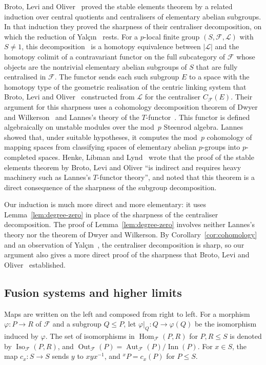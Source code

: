 \documentclass[10pt]{amsart}
\theoremstyle{definition}
\DeclareMathOperator{\Aut}{Aut}
\DeclareMathOperator{\Out}{Out}
\DeclareMathOperator{\Hom}{Hom}
\numberwithin{equation}{section}
\renewcommand{\le}{\leqslant}
\newcommand{\F}{\mathcal F}
\newcommand{\Inn}{\operatorname{Inn}}
\newcommand{\Iso}{\operatorname{Iso}}
\begin{document}
Broto, Levi and Oliver~\cite[proof of Theorem~5.8]{BLO} proved the stable elements theorem by a related induction over central quotients and centralisers of elementary abelian subgroups. In that induction they proved the sharpness of their centraliser decomposition, on which the reduction of Yal\c{c}\i{}n~\cite[Theorem~1.8]{Yalcin} rests. For a $p$-local finite group $(S,\F,\mathcal L)$ with $S\ne1$, this decomposition~\cite[Theorem~2.6]{BLO} is a homotopy equivalence between $|\mathcal L|$ and the homotopy colimit of a contravariant functor on the full subcategory of $\F$ whose objects are the nontrivial elementary abelian subgroups of $S$ that are fully centralised in $\F$. The functor sends each such subgroup $E$ to a space with the homotopy type of the geometric realisation of the centric linking system that Broto, Levi and Oliver~\cite[Definition~2.4 and Proposition~2.5(c)]{BLO} constructed from $\mathcal L$ for the centraliser $C_\F(E)$. Their argument for this sharpness uses a cohomology decomposition theorem of Dwyer and Wilkerson~\cite[Theorem~1.2]{DW1992} and Lannes's theory of the $T$-functor~\cite{Lannes1992}. This functor is defined algebraically on unstable modules over the mod~$p$ Steenrod algebra. Lannes~\cite[Theorem~0.6]{Lannes1992} showed that, under suitable hypotheses, it computes the mod~$p$ cohomology of mapping spaces from classifying spaces of elementary abelian $p$-groups into $p$-completed spaces. Henke, Libman and Lynd~\cite[\S1.1]{HLL} wrote that the proof of the stable elements theorem by Broto, Levi and Oliver ``is indirect and requires heavy machinery such as Lannes's $T$\nobreakdash-functor theory'', and noted that this theorem is a direct consequence of the sharpness of the subgroup decomposition.

Our induction is much more direct and more elementary: it uses Lemma~\ref{lem:degree-zero} in place of the sharpness of the centraliser decomposition. The proof of Lemma~\ref{lem:degree-zero} involves neither Lannes's theory nor the theorem of Dwyer and Wilkerson. By Corollary~\ref{cor:cohomology} and an observation of Yal\c{c}\i{}n~\cite[\S9, p.~55]{Yalcin}, the centraliser decomposition is sharp, so our argument also gives a more direct proof of the sharpness that Broto, Levi and Oliver~\cite[proof of Theorem~5.8]{BLO} established.

\subsection{Fusion systems and higher limits}
Maps are written on the left and composed from right to left. For a morphism $\varphi\colon P\to R$ of $\F$ and a subgroup $Q\le P$, let $\varphi|_Q\colon Q\to\varphi(Q)$ be the isomorphism induced by $\varphi$. The set of isomorphisms in $\Hom_\F(P,R)$ for $P,R\le S$ is denoted by $\Iso_\F(P,R)$, and $\Out_\F(P)=\Aut_\F(P)/\Inn(P)$. For $x\in S$, the map $c_x\colon S\to S$ sends $y$ to $xyx^{-1}$, and ${}^xP=c_x(P)$ for $P\le S$.
\end{document}
